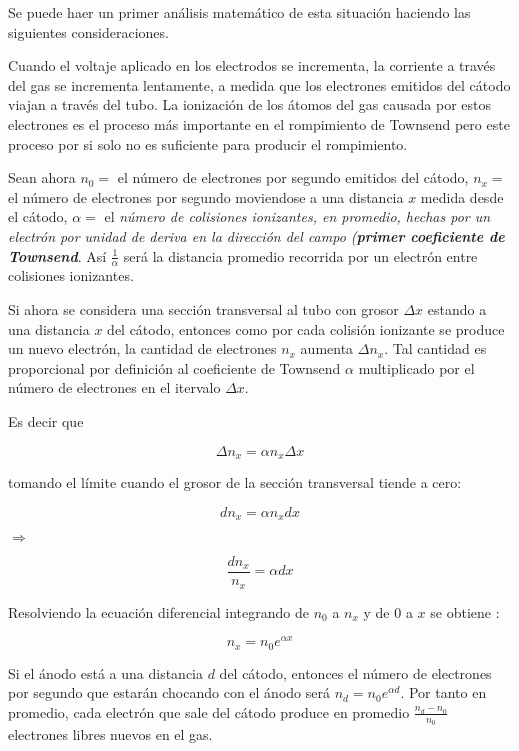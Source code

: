 \documentclass[letterpaper,12pt]{article}
\begin{document}
Se puede haer un primer análisis matemático de esta situación haciendo las siguientes consideraciones.

Cuando el voltaje aplicado en los electrodos se incrementa, la corriente a través del gas se incrementa lentamente, a medida que los electrones emitidos del cátodo  viajan a través del tubo.  La ionización de los átomos del gas causada por estos electrones es el proceso más importante en el rompimiento de Townsend pero este proceso por si solo no es suficiente para producir el rompimiento.

Sean ahora $ n_0=$ el número de electrones por segundo emitidos del cátodo, $n_x=$ el número de electrones por segundo moviendose a una distancia $x$ medida desde el cátodo, $\alpha=$ el \textit{número de colisiones ionizantes, en promedio, hechas por un electrón por unidad de deriva en la dirección del campo (\textbf{primer coeficiente de Townsend}}. Así $\frac{1}{\alpha}$ será la distancia promedio recorrida por un electrón entre 
colisiones ionizantes.

Si ahora se considera una sección transversal al tubo con grosor $\Delta x$ estando a una distancia $x$ del cátodo, entonces como por cada colisión ionizante se produce un nuevo electrón, la cantidad de electrones $n_x$ aumenta $\Delta n_x$. Tal cantidad es proporcional por definición al coeficiente de Townsend $\alpha$ multiplicado por el número de electrones en el itervalo $\Delta x$.

Es decir que 

$$ \Delta n_x=\alpha n_x \Delta x$$

tomando el límite cuando el grosor de la sección transversal  tiende a cero:

$$dn_x=\alpha n_x dx$$

$\Rightarrow$

$$\frac{dn_x}{n_x}=\alpha dx$$

Resolviendo la ecuación diferencial integrando de $n_0$ a $n_x$ y de $0$ a $x$ se obtiene :

\begin{equation}
 n_x=n_0e^{\alpha x}  \label{nx}
\end{equation}

Si el ánodo está a una distancia $d$ del cátodo, entonces el número de electrones por segundo  que estarán chocando con el ánodo será $ n_d=n_0e^{\alpha d}$. Por tanto en promedio, cada electrón que sale del cátodo produce en promedio $\frac{n_d-n_0}{n_0}$ electrones libres  nuevos en el gas.
\end{document}
